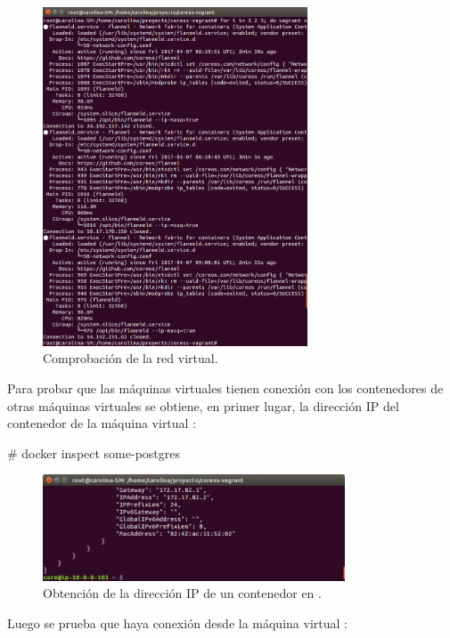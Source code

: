 \begin{figure}[H]
\centering
\includegraphics[width=0.7\textwidth]{images/figures/flanneld-aws-3.png}
\caption{Comprobación de la red virtual.}
\end{figure}

Para probar que las máquinas virtuales tienen conexión con los contenedores de otras máquinas virtuales se obtiene, en primer lugar, la dirección IP del contenedor  de la máquina virtual :

\begin{code}
# docker inspect some-postgres
\end{code}

\begin{figure}[H]
\centering
\includegraphics[width=0.8\textwidth]{images/figures/docker-inspect-3.png}
\caption{Obtención de la dirección IP de un contenedor en .}
\end{figure}

Luego se prueba que haya conexión desde la máquina virtual :

